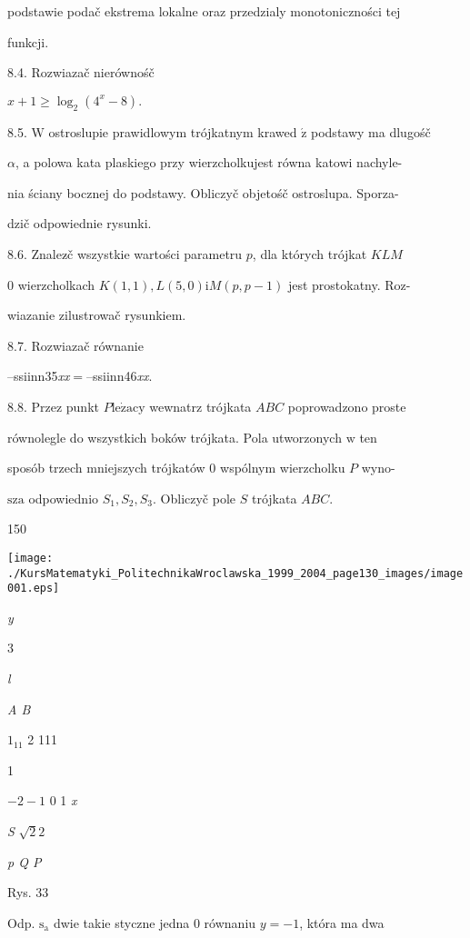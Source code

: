 \documentclass[a4paper,12pt]{article}
\begin{document}
podstawie podač ekstrema lokalne oraz przedzialy monotoniczności tej

funkcji.

8.4. Rozwiazač nierównośč

$x+1\geq\log_{2}(4^{x}-8).$

8.5. $\mathrm{W}$ ostroslupie prawidlowym trójkatnym krawed $\acute{\mathrm{z}}$ podstawy ma dlugośč

$\alpha$, a polowa kata plaskiego przy wierzcholkujest równa katowi nachyle-

nia ściany bocznej do podstawy. Obliczyč objetośč ostroslupa. Sporza-

dzič odpowiednie rysunki.

8.6. Znalez$\acute{}$č wszystkie wartości parametru $p$, dla których trójkat $KLM$

$0$ wierzcholkach $K(1,1), L(5,0)\mathrm{i}M(p,p-1)$ jest prostokatny. Roz-

wiazanie zilustrowač rysunkiem.

8.7. Rozwiazač równanie

--ssiinn35{\it xx}$=$--ssiinn46{\it xx}.

8.8. Przez punkt $P\mathrm{l}\mathrm{e}\dot{\mathrm{z}}\mathrm{a}\mathrm{c}\mathrm{y}$ wewnatrz trójkata $ABC$ poprowadzono proste

równolegle do wszystkich boków trójkata. Pola utworzonych $\mathrm{w}$ ten

sposób trzech mniejszych trójkatów $0$ wspólnym wierzcholku $P$ wyno-

$\mathrm{s}\mathrm{z}\mathrm{a}$ odpowiednio $S_{1}, S_{2}, S_{3}$. Obliczyč pole $S$ trójkata $ABC.$





150
\begin{center}
\texttt{[image: ./KursMatematyki\_PolitechnikaWroclawska\_1999\_2004\_page130\_images/image001.eps]}
\end{center}
{\it y}

3

{\it l}

{\it A  B}

$1_{11}$  2  111

1

$-2  -1$  0 1  {\it x}

{\it S}  $\sqrt{2}2$

{\it p  Q  P}

Rys. 33

Odp. $\mathrm{s}_{\mathrm{a}}$ dwie takie styczne jedna $0$ równaniu $y= -1$, która ma dwa
\end{document}
